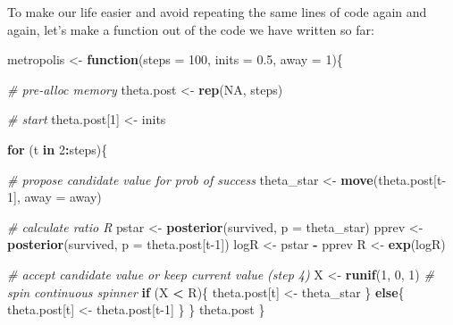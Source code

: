 \documentclass[
  12pt,
]{krantz}
\newenvironment{Shaded}{\begin{snugshade}}{\end{snugshade}}
\newcommand{\AttributeTok}[1]{\textcolor[rgb]{0.13,0.29,0.53}{#1}}
\newcommand{\CommentTok}[1]{\textcolor[rgb]{0.56,0.35,0.01}{\textit{#1}}}
\newcommand{\ConstantTok}[1]{\textcolor[rgb]{0.56,0.35,0.01}{#1}}
\newcommand{\ControlFlowTok}[1]{\textcolor[rgb]{0.13,0.29,0.53}{\textbf{#1}}}
\newcommand{\DecValTok}[1]{\textcolor[rgb]{0.00,0.00,0.81}{#1}}
\newcommand{\FloatTok}[1]{\textcolor[rgb]{0.00,0.00,0.81}{#1}}
\newcommand{\FunctionTok}[1]{\textcolor[rgb]{0.13,0.29,0.53}{\textbf{#1}}}
\newcommand{\NormalTok}[1]{#1}
\newcommand{\OtherTok}[1]{\textcolor[rgb]{0.56,0.35,0.01}{#1}}
\newcommand{\SpecialCharTok}[1]{\textcolor[rgb]{0.81,0.36,0.00}{\textbf{#1}}}
\begin{document}
To make our life easier and avoid repeating the same lines of code again and again, let's make a function out of the code we have written so far:

\begin{Shaded}
\begin{Highlighting}[]
\NormalTok{metropolis }\OtherTok{\textless{}{-}} \ControlFlowTok{function}\NormalTok{(}\AttributeTok{steps =} \DecValTok{100}\NormalTok{, }\AttributeTok{inits =} \FloatTok{0.5}\NormalTok{, }\AttributeTok{away =} \DecValTok{1}\NormalTok{)\{}
  
  \CommentTok{\# pre{-}alloc memory}
\NormalTok{  theta.post }\OtherTok{\textless{}{-}} \FunctionTok{rep}\NormalTok{(}\ConstantTok{NA}\NormalTok{, steps)}
  
  \CommentTok{\# start}
\NormalTok{  theta.post[}\DecValTok{1}\NormalTok{] }\OtherTok{\textless{}{-}}\NormalTok{ inits}
  
  \ControlFlowTok{for}\NormalTok{ (t }\ControlFlowTok{in} \DecValTok{2}\SpecialCharTok{:}\NormalTok{steps)\{}
    
    \CommentTok{\# propose candidate value for prob of success}
\NormalTok{    theta\_star }\OtherTok{\textless{}{-}} \FunctionTok{move}\NormalTok{(theta.post[t}\DecValTok{{-}1}\NormalTok{], }\AttributeTok{away =}\NormalTok{ away)}
    
    \CommentTok{\# calculate ratio R}
\NormalTok{    pstar }\OtherTok{\textless{}{-}} \FunctionTok{posterior}\NormalTok{(survived, }\AttributeTok{p =}\NormalTok{ theta\_star)  }
\NormalTok{    pprev }\OtherTok{\textless{}{-}} \FunctionTok{posterior}\NormalTok{(survived, }\AttributeTok{p =}\NormalTok{ theta.post[t}\DecValTok{{-}1}\NormalTok{])}
\NormalTok{    logR }\OtherTok{\textless{}{-}}\NormalTok{ pstar }\SpecialCharTok{{-}}\NormalTok{ pprev}
\NormalTok{    R }\OtherTok{\textless{}{-}} \FunctionTok{exp}\NormalTok{(logR)}
    
    \CommentTok{\# accept candidate value or keep current value (step 4)}
\NormalTok{    X }\OtherTok{\textless{}{-}} \FunctionTok{runif}\NormalTok{(}\DecValTok{1}\NormalTok{, }\DecValTok{0}\NormalTok{, }\DecValTok{1}\NormalTok{) }\CommentTok{\# spin continuous spinner}
    \ControlFlowTok{if}\NormalTok{ (X }\SpecialCharTok{\textless{}}\NormalTok{ R)\{}
\NormalTok{      theta.post[t] }\OtherTok{\textless{}{-}}\NormalTok{ theta\_star}
\NormalTok{    \}}
    \ControlFlowTok{else}\NormalTok{\{}
\NormalTok{      theta.post[t] }\OtherTok{\textless{}{-}}\NormalTok{ theta.post[t}\DecValTok{{-}1}\NormalTok{]}
\NormalTok{    \}}
\NormalTok{  \}}
\NormalTok{  theta.post}
\NormalTok{\}}
\end{Highlighting}
\end{Shaded}
\end{document}
